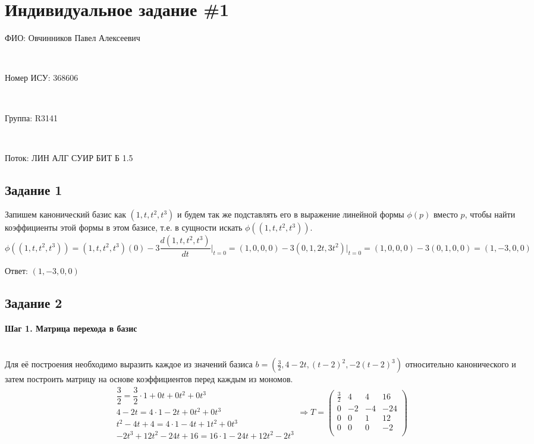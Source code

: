 \documentclass{article}
\newcommand{\at}{\biggr\rvert}
\begin{document}
\section*{Индивидуальное задание \#1}
\begin{multicols}{2}
\noindent\begin{large}ФИО: Овчинников Павел Алексеевич\end{large} \\
\begin{large}Номер ИСУ: 368606\end{large} \\
\begin{large}Группа: R3141\end{large} \\
\begin{large}Поток: ЛИН АЛГ СУИР БИТ Б 1.5\end{large}
\end{multicols}

\subsection*{Задание 1}
Запишем канонический базис как $\left(1, t, t^2, t^3\right)$ и будем так же подставлять его в выражение линейной формы $\phi(p)$ вместо $p$, чтобы найти коэффициенты этой формы в этом базисе, т.е. в сущности искать $\phi\left((1, t, t^2, t^3)\right)$. \\
$$\phi\left((1, t, t^2, t^3)\right) = \left(1, t, t^2, t^3\right)(0) - 3\frac{d\left(1, t, t^2, t^3\right)}{dt}\at_{t=0} = (1, 0, 0, 0) - 3\left(0, 1, 2t, 3t^2\right)|_{t=0} = (1, 0, 0, 0) - 3(0, 1, 0, 0) = (1, -3, 0, 0)$$
\begin{flushright}Ответ: $(1, -3, 0, 0)$\end{flushright}

\subsection*{Задание 2}
\paragraph*{Шаг 1. Матрица перехода в базис} \, \\
Для её построения необходимо выразить каждое из значений базиса $b=\left(\frac{3}{2}, 4-2t, (t-2)^{2}, -2(t-2)^{3}\right)$ относительно канонического и затем построить матрицу на основе коэффициентов перед каждым из мономов.
$$\begin{array}{r|}
\dfrac{3}{2} = \dfrac{3}{2}\cdot1 + 0t + 0t^2 + 0t^3 \\
4 - 2t = 4\cdot1 - 2t + 0t^2 + 0t^3 \\
t^2 - 4t + 4 = 4\cdot1-4t+1t^2+0t^3 \\
-2t^3+12t^2-24t+16 = 16\cdot1-24t+12t^2-2t^3
\end{array} \Rightarrow T = \begin{pmatrix}
\frac{3}{2} & 4 & 4 & 16 \\
0 & -2 & -4 & -24 \\
0 & 0 & 1 & 12 \\
0 & 0 & 0 & -2 \\
\end{pmatrix}$$
\end{document}
